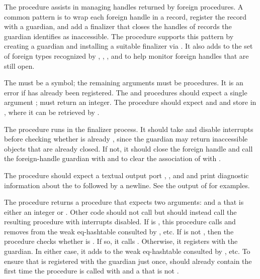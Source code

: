 The  procedure assists in managing handles
returned by foreign procedures.
A common pattern is to wrap each foreign handle in a record, register the
record with a guardian, and add a finalizer that closes the handles of records
the guardian identifies as inaccessible.
The  procedure supports this pattern
by creating a guardian and installing a suitable finalizer via .
It also adds  to the set of foreign types recognized by
,
,
, and
to help monitor foreign handles that are still open.

The  must be a symbol; the remaining arguments must be
procedures.  It is an error if  has already been registered.
The  and  procedures should expect a
single argument ;  must return an integer.
The  procedure should expect  and  and
store  in , where it can be retrieved by .

The  procedure runs in the finalizer process.
It should take  and disable interrupts before checking whether
 is already ,
since the guardian may return inaccessible objects that are already closed.
If not, it should close the foreign handle and call the foreign-handle guardian
with  and  to clear the association of  with .

The  procedure should expect a textual output port ,
, and  and print diagnostic information about the
 to  followed by a newline.
See the output of  for examples.

The  procedure returns a procedure
that expects two arguments:  and a  that is
either an integer or .
Other code should not call  but should instead
call the resulting procedure with interrupts disabled.
If  is , this procedure calls
and removes  from the weak eq-hashtable consulted by
, etc.
If  is not , then
the procedure checks whether 
is .
If so, it calls .
Otherwise, it registers  with the guardian.
In either case, it adds  to the weak eq-hashtable
consulted by , etc.
To ensure that  is registered with the guardian just once,
 should already contain  the first time
the procedure is called with  and a  that
is not .

